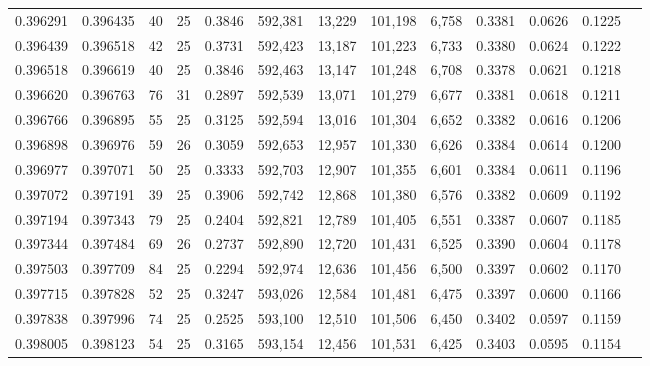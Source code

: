 \begin{tabular}{rrrrrrrrrrrrr}
0.396291 & 0.396435 &    40 &  25 &                                     0.3846 & 592,381 &  13,229 & 101,198 &   6,758 & 0.3381 & 0.0626 & 0.1225 \\
0.396439 & 0.396518 &    42 &  25 &                                     0.3731 & 592,423 &  13,187 & 101,223 &   6,733 & 0.3380 & 0.0624 & 0.1222 \\
0.396518 & 0.396619 &    40 &  25 &                                     0.3846 & 592,463 &  13,147 & 101,248 &   6,708 & 0.3378 & 0.0621 & 0.1218 \\
0.396620 & 0.396763 &    76 &  31 &                                     0.2897 & 592,539 &  13,071 & 101,279 &   6,677 & 0.3381 & 0.0618 & 0.1211 \\
0.396766 & 0.396895 &    55 &  25 &                                     0.3125 & 592,594 &  13,016 & 101,304 &   6,652 & 0.3382 & 0.0616 & 0.1206 \\
0.396898 & 0.396976 &    59 &  26 &                                     0.3059 & 592,653 &  12,957 & 101,330 &   6,626 & 0.3384 & 0.0614 & 0.1200 \\
0.396977 & 0.397071 &    50 &  25 &                                     0.3333 & 592,703 &  12,907 & 101,355 &   6,601 & 0.3384 & 0.0611 & 0.1196 \\
0.397072 & 0.397191 &    39 &  25 &                                     0.3906 & 592,742 &  12,868 & 101,380 &   6,576 & 0.3382 & 0.0609 & 0.1192 \\
0.397194 & 0.397343 &    79 &  25 &                                     0.2404 & 592,821 &  12,789 & 101,405 &   6,551 & 0.3387 & 0.0607 & 0.1185 \\
0.397344 & 0.397484 &    69 &  26 &                                     0.2737 & 592,890 &  12,720 & 101,431 &   6,525 & 0.3390 & 0.0604 & 0.1178 \\
0.397503 & 0.397709 &    84 &  25 &                                     0.2294 & 592,974 &  12,636 & 101,456 &   6,500 & 0.3397 & 0.0602 & 0.1170 \\
0.397715 & 0.397828 &    52 &  25 &                                     0.3247 & 593,026 &  12,584 & 101,481 &   6,475 & 0.3397 & 0.0600 & 0.1166 \\
0.397838 & 0.397996 &    74 &  25 &                                     0.2525 & 593,100 &  12,510 & 101,506 &   6,450 & 0.3402 & 0.0597 & 0.1159 \\
0.398005 & 0.398123 &    54 &  25 &                                     0.3165 & 593,154 &  12,456 & 101,531 &   6,425 & 0.3403 & 0.0595 & 0.1154 \\

\end{tabular}
